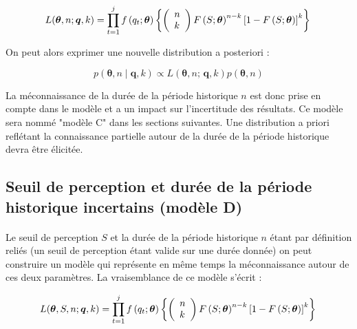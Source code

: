 				\begin{equation}
				L(\boldsymbol{\theta}, n ; \boldsymbol{q}, k) = \prod_{t=1}^j f\left(q_t;\boldsymbol{\theta}\right) \left\{\left(\begin{array}{l}
				n \\
				k
				\end{array}\right) F\left(S;\boldsymbol{\theta}\right)^{n-k}\left[1-F\left(S;\boldsymbol{\theta}\right)\right]^k\right\} \\
				\label{eq:Gev_Binom_uN}
				\end{equation}
				
		On peut alors exprimer une nouvelle distribution a posteriori :
		
				\begin{equation}
					p(\boldsymbol{\theta}, n \mid \boldsymbol{q},k) \propto L(\boldsymbol{\theta},n;\,\boldsymbol{q},k) p(\boldsymbol{\theta},n)
					\label{eq:Bayes_uN}
				\end{equation}
			
		La méconnaissance de la durée de la période historique $n$ est donc prise en compte dans le modèle et a un impact sur l'incertitude des résultats. Ce modèle sera nommé "modèle C" dans les sections suivantes. Une distribution a priori reflétant la connaissance partielle autour de la durée de la période historique devra être élicitée. 
	
	\subsection{Seuil de perception et durée de la période historique incertains (modèle D)}
	\label{subsec:modD}	
	
	\paragraph{}
	Le seuil de perception $S$ et la durée de la période historique $n$ étant par définition reliés (un seuil de perception étant valide sur une durée donnée) on peut construire un modèle qui représente en même temps la méconnaissance autour de ces deux paramètres. La vraisemblance de ce modèle s'écrit :  
	
					\begin{equation}
			L(\boldsymbol{\theta}, S, n ; \boldsymbol{q}, k) = \prod_{t=1}^j f\left(q_t;\boldsymbol{\theta}\right) \left\{\left(\begin{array}{l}
			n \\
			k
			\end{array}\right) F\left(S;\boldsymbol{\theta}\right)^{n-k}\left[1-F\left(S;\boldsymbol{\theta}\right)\right]^k\right\} \\
			\label{eq:Gev_Binom_SN}
			\end{equation}
		
